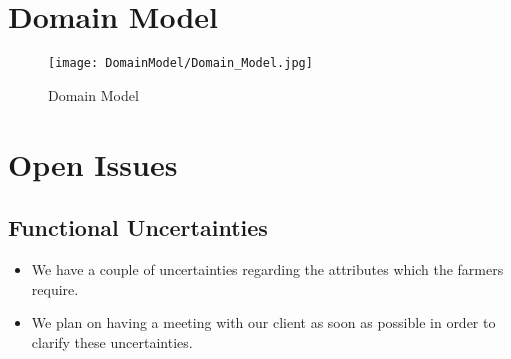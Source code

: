 \documentclass[11pt,fleqn]{book} %
\begin{document}

\chapter{Domain Model}
\begin{figure}
	\texttt{[image: DomainModel/Domain\_Model.jpg]}
	\caption{Domain Model}
\end{figure}
	
	


\chapter{Open Issues}

\section{Functional Uncertainties}
\begin{itemize}
	\item We have a couple of uncertainties regarding the attributes which the farmers require.
	\item We plan on having a meeting with our client as soon as possible in order to clarify these uncertainties.
\end{itemize}
\end{document}
